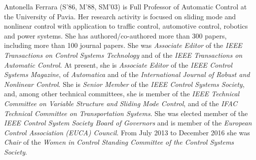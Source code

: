 \documentclass[10pt]{IEEEtran}      %
\theoremstyle{theorem}
\theoremstyle{remark}
\begin{document}
\begin{IEEEbiography}
{Antonella Ferrara}
(S'86, M'88, SM'03) is Full Professor of Automatic Control at the University of Pavia. Her research activity is focused on sliding mode and nonlinear control with application to traffic control, automotive control, robotics and power systems. She has authored/co-authored more than 300 papers, including more than 100 journal papers. She was {\it{Associate Editor}} of the {\it{IEEE Transactions on Control Systems Technology}} and of the {\it{IEEE Transactions on Automatic Control}}.
At present, she is {\it{Associate Editor}} of the {\it{IEEE Control Systems Magazine}}, of {\it{Automatica}} and of the {\it{International Journal of Robust and Nonlinear Control}}.
She is {\it{Senior Member}} of the {\it{IEEE Control Systems Society}}, and, among other technical committees, she is member of the {\it{IEEE Technical Committee on Variable Structure and Sliding Mode Control}}, and of the {\it{IFAC Technical Committee on Transportation Systems}}.
She was elected member of the {\it{IEEE Control System Society Board of Governors}} and is member of the {\it{European Control Association (EUCA) Council}}.
From July 2013 to December 2016 she was {\it{Chair}} of the {\it{Women in Control Standing Committee of the Control Systems Society}}.
\end{IEEEbiography}
\end{document}
